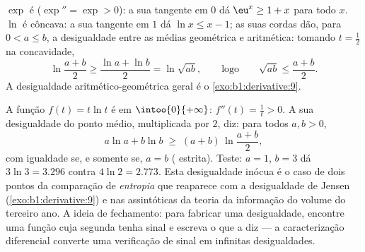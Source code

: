 \begin{example}\label{ex:b1:derivative:convexineq}
$\exp$ é  ($\exp'' = \exp > 0$): a sua tangente em $0$ dá
$\eu^x \geq 1 + x$ para todo $x$. $\ln$ é côncava: a sua tangente em $1$
dá $\ln x \leq x - 1$; as suas cordas dão, para $0 < a \leq b$, a
desigualdade entre as médias geométrica e aritmética: tomando $t =
\frac12$ na concavidade,
\[
\ln\frac{a + b}{2} \geq \frac{\ln a + \ln b}{2} = \ln\sqrt{ab},
\qquad\text{logo}\qquad
\sqrt{ab} \leq \frac{a+b}{2} .
\]
A desigualdade aritmético-geométrica geral é o
\cref{exo:b1:derivative:9}.
\end{example}

\begin{example}\label{ex:b1:derivative:xlnx}
A função $f(t) = t\ln t$ é  em $\intoo{0}{+\infty}$:
$f''(t) = \frac1t > 0$. A sua desigualdade do ponto médio, multiplicada por
$2$, diz: para todos $a, b > 0$,
\[
a\ln a + b\ln b \;\geq\; (a + b)\,\ln\frac{a + b}{2} ,
\]
com igualdade se, e somente se, $a = b$ ( estrita). Teste: $a =
1$, $b = 3$ dá $3\ln 3 = 3.296$ contra $4\ln 2 = 2.773$.
Esta desigualdade inócua é o caso de dois pontos da comparação de
\emph{entropia} que reaparece com a desigualdade de Jensen
(\cref{exo:b1:derivative:9}) e nas assintóticas da teoria da
informação do volume do terceiro ano. A
ideia de fechamento: para fabricar uma desigualdade, encontre uma função
cuja segunda  tenha sinal e escreva o que a 
diz --- a caracterização diferencial converte uma verificação de sinal
em infinitas desigualdades.
\end{example}

